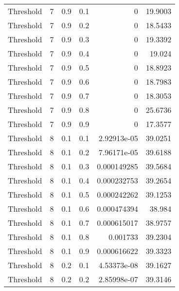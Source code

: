 \documentclass{article}
\begin{document}
\begin{longtable}[H]{lrrrrr}
 Threshold      &       7 &   0.9 &            0.1 &      0           &         19.9003 \\
 Threshold      &       7 &   0.9 &            0.2 &      0           &         18.5433 \\
 Threshold      &       7 &   0.9 &            0.3 &      0           &         19.3392 \\
 Threshold      &       7 &   0.9 &            0.4 &      0           &         19.024  \\
 Threshold      &       7 &   0.9 &            0.5 &      0           &         18.8923 \\
 Threshold      &       7 &   0.9 &            0.6 &      0           &         18.7983 \\
 Threshold      &       7 &   0.9 &            0.7 &      0           &         18.3053 \\
 Threshold      &       7 &   0.9 &            0.8 &      0           &         25.6736 \\
 Threshold      &       7 &   0.9 &            0.9 &      0           &         17.3577 \\
 Threshold      &       8 &   0.1 &            0.1 &      2.92913e-05 &         39.0251 \\
 Threshold      &       8 &   0.1 &            0.2 &      7.96171e-05 &         39.6188 \\
 Threshold      &       8 &   0.1 &            0.3 &      0.000149285 &         39.5684 \\
 Threshold      &       8 &   0.1 &            0.4 &      0.000232753 &         39.2654 \\
 Threshold      &       8 &   0.1 &            0.5 &      0.000242262 &         39.1253 \\
 Threshold      &       8 &   0.1 &            0.6 &      0.000474394 &         38.984  \\
 Threshold      &       8 &   0.1 &            0.7 &      0.000615017 &         38.9757 \\
 Threshold      &       8 &   0.1 &            0.8 &      0.001733    &         39.2304 \\
 Threshold      &       8 &   0.1 &            0.9 &      0.000616622 &         39.3323 \\
 Threshold      &       8 &   0.2 &            0.1 &      4.53373e-08 &         39.1627 \\
 Threshold      &       8 &   0.2 &            0.2 &      2.85998e-07 &         39.3146 \\

\end{longtable}
\end{document}
